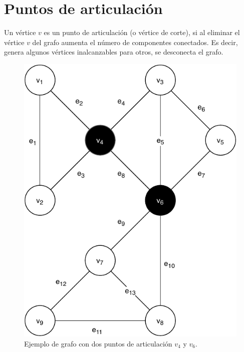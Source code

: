 
\section{Puntos de articulación}\label{articulation-points}
Un vértice \( v \) es un punto de articulación (o vértice de corte), si al eliminar el vértice \( v \) del grafo aumenta el número de componentes conectados. Es decir, genera algunos vértices inalcanzables para otros, se desconecta el grafo.

\begin{figure}[H]
	\centering
	\includegraphics[width=0.4\linewidth]{document/ArticulationPoints/images/example-of-articulation-points}
	\caption{Ejemplo de grafo con dos puntos de articulación \( v_4 \) y \( v_6 \).}
	\label{fig:connected-disconnected-graph}
\end{figure}